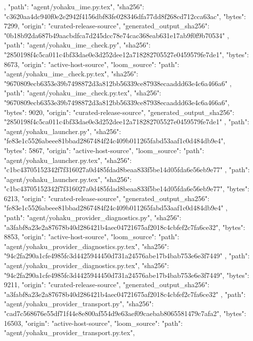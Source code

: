 {{{      }
    },
    {
      "path": "agent/yohaku_ime.py.tex",
      "sha256": "c3620aa4dc940f0e2e2942f4156dbf83fe028346dfa77dd8f268cd712cca63ac",
      "bytes": 7299,
      "origin": "curated-release-source",
      "generated_output_sha256": "0b18b92da687b49aacbdfca7d245dcc78e74cac368eab631e17ab9f0f9b70534"
    },
    {
      "path": "agent/yohaku_ime_check.py",
      "sha256": "2850198f4c5ca011c4bf33dae0e3d252dee12a718282705527e0459579fe7de1",
      "bytes": 8673,
      "origin": "active-host-source",
      "loom_source": {
        "path": "agent/yohaku_ime_check.py.tex",
        "sha256": "9670809ecb6353e39b7498872d3a812bb56339ce87938ecaaddd63e4c6a466a6"
      }
    },
    {
      "path": "agent/yohaku_ime_check.py.tex",
      "sha256": "9670809ecb6353e39b7498872d3a812bb56339ce87938ecaaddd63e4c6a466a6",
      "bytes": 9020,
      "origin": "curated-release-source",
      "generated_output_sha256": "2850198f4c5ca011c4bf33dae0e3d252dee12a718282705527e0459579fe7de1"
    },
    {
      "path": "agent/yohaku_launcher.py",
      "sha256": "fe83e1c5526abeee81bbad2867484f24c409b011265fabd53aaf1c0d484db9e4",
      "bytes": 5867,
      "origin": "active-host-source",
      "loom_source": {
        "path": "agent/yohaku_launcher.py.tex",
        "sha256": "c1bc43705152342f7f316027a0d485fdad8beaa833f5be14d05fda6e56eb9e77"
      }
    },
    {
      "path": "agent/yohaku_launcher.py.tex",
      "sha256": "c1bc43705152342f7f316027a0d485fdad8beaa833f5be14d05fda6e56eb9e77",
      "bytes": 6213,
      "origin": "curated-release-source",
      "generated_output_sha256": "fe83e1c5526abeee81bbad2867484f24c409b011265fabd53aaf1c0d484db9e4"
    },
    {
      "path": "agent/yohaku_provider_diagnostics.py",
      "sha256": "a3fabf8a23e2a87678b40d286421b4aec04721675af2018c4cbfef2c7fa6ce32",
      "bytes": 8853,
      "origin": "active-host-source",
      "loom_source": {
        "path": "agent/yohaku_provider_diagnostics.py.tex",
        "sha256": "94c2fa290a1cfe4985fc3d4425944450d731a24576abe17b4bab753e6e3f7449"
      }
    },
    {
      "path": "agent/yohaku_provider_diagnostics.py.tex",
      "sha256": "94c2fa290a1cfe4985fc3d4425944450d731a24576abe17b4bab753e6e3f7449",
      "bytes": 9211,
      "origin": "curated-release-source",
      "generated_output_sha256": "a3fabf8a23e2a87678b40d286421b4aec04721675af2018c4cbfef2c7fa6ce32"
    },
    {
      "path": "agent/yohaku_provider_transport.py",
      "sha256": "cad7c568676e55df71f44e8e800af554d9e63aef09caebab8065581479c7afa2",
      "bytes": 16503,
      "origin": "active-host-source",
      "loom_source": {
        "path": "agent/yohaku_provider_transport.py.tex",
}}}
